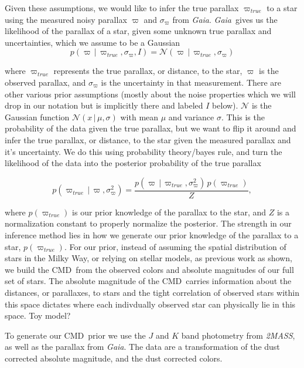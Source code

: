 \documentclass[modern]{aastex61}
\newcommand{\acronym}[1]{{\small{#1}}}
\newcommand{\project}[1]{\textsl{#1}}
\newcommand{\tmass}{\project{\acronym{2MASS}}}
\newcommand{\gaia}{\project{Gaia}}
\newcommand{\cmd}{\acronym{CMD}}
\newcommand{\given}{\,|\,}
\begin{document}
Given these assumptions, we would like to infer the true parallax $\varpi_{true}$ to a star using the measured noisy parallax $\varpi$ and $\sigma_{\varpi}$ from \gaia. \gaia\ gives us the likelihood of the parallax of a star, given some unknown true parallax and uncertainties, which we assume to be a Gaussian
\begin{equation}
p(\varpi \given \varpi_{true}, \sigma_{\varpi},I) = \mathcal{N}(\varpi \given \varpi_{true}, \sigma_{\varpi})
\label{eq:gaialike}
\end{equation}

where $\varpi_{true}$ represents the true parallax, or distance, to the star, $\varpi$ is the observed parallax, and $\sigma_{\varpi}$ is the uncertainty in that measurement. There are other various prior assumptions (mostly about the noise properties which we will drop in our notation but is implicitly there and labeled $I$ below). $\mathcal{N}$ is the Gaussian function $\mathcal{N}(x \given \mu, \sigma)$ with mean $\mu$ and variance $\sigma$. This is the probability of the data given the true parallax, but we want to flip it around and infer the true parallax, or distance, to the star given the measured parallax and it's uncertainty. We do this using probability theory/bayes rule, and turn the likelihood of the data into the posterior probability of the true parallax

\begin{equation}
p(\varpi_{true} \given \varpi, \sigma^2_{\varpi}) = \frac{p(\varpi \given \varpi_{true}, \sigma^2_{\varpi}) \, p(\varpi_{true})}{Z},
\label{eq:bayes}
\end{equation}

where $p(\varpi_{true})$ is our prior knowledge of the parallax to the star, and $Z$ is a normalization constant to properly normalize the posterior. The strength in our inference method lies in how we generate our prior knowledge of the parallax to a star, $p(\varpi_{true})$. For our prior, instead of assuming the spatial distribution of stars in the Milky Way, or relying on stellar models, as previous work as shown, we build the \cmd\ from the observed colors and absolute magnitudes of our full set of stars. The absolute magnitude of the \cmd\ carries information about the distances, or parallaxes, to stars and the tight correlation of observed stars within this space dictates where each indivdually observed star can physically lie in this space. Toy model?

To generate our \cmd\ prior we use the $J$ and $K$ band photometry from \tmass, as well as the parallax from \gaia. The data are a transformation of the dust corrected absolute magnitude, and the dust corrected colors.
\end{document}
